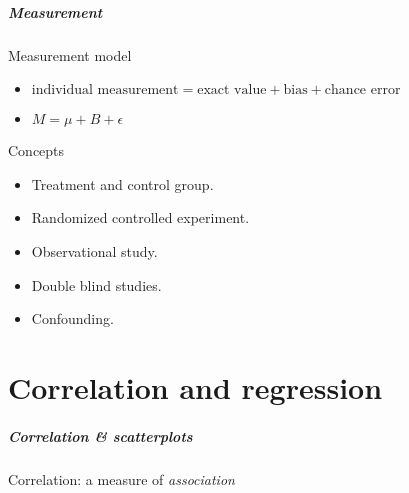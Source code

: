 \documentclass[handout]{beamer}
\begin{document}
   \begin{frame} \frametitle{Measurement}

   \begin{block}
   {Measurement model}

   \begin{itemize}
   \item    $
   \text{individual measurement} = \text{exact value} + \text{bias} + \text{chance error}
   $


   \item  $
   M = \mu + B + \epsilon
   $
   \end{itemize}

   \end{block}

   \begin{block}
     {Concepts}
     \begin{itemize}
     \item Treatment and control group.
       \item Randomized controlled experiment.
         \item Observational study.
           \item Double blind studies.
             \item Confounding.
     \end{itemize}
   \end{block}
   \end{frame}

   \part{Correlation and regression}
   \frame{\partpage}



   \begin{frame}
   \frametitle{Correlation \& scatterplots}
   \begin{center}
   \end{center}
   Correlation: a measure of {\em association}
   \end{frame}
\end{document}
